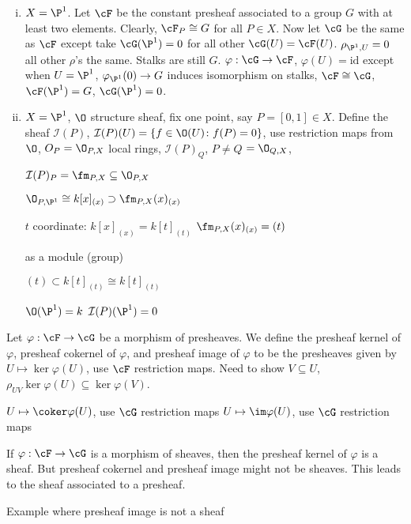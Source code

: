 \begin{enumerate}[(i)]
\item $X= \P^1$. Let $\cF$ be the constant presheaf associated to a group $G$ with at least two elements. Clearly, $\cF_P \cong G$ for all $P \in X$. Now let $\cG$ be the same as $\cF$ except take $\cG(\P^1)=0$ for all other $\cG(U)= \cF(U)$. $\rho_{\P^1,U}= 0$ all other $\rho$'s the same. Stalks are still $G$. $\varphi: \cG \to \cF$, $\varphi(U)= \text{id}$ except when $U= \P^1$, $\varphi_{\P^1}(0) \to G$  induces isomorphism on stalks, $\cF \cong \cG$, $\cF(\P^1)= G$, $\cG(\P^1)= 0$.

\item $X= \P^1$, $\O$ structure sheaf, fix one point, say $P= [0,1] \in X$. Define the sheaf $\mathcal{I}(P)$, $\mathcal{I}(P)(U)= \{ f \in \O(U) \colon f(P)=0 \}$, use restriction maps from $\O$, $O_P= \O_{P,X}$ local rings, $\mathcal{I}(P)_Q$, $P \neq Q$ $=\O_{Q,X}$,

$\mathcal{I}(P)_P= \fm_{P,X} \subseteq \O_{P,X}$

$\O_{P,\P^1} \cong k[x]_{(x)} \supset \fm_{P,X}(x)_{(x)}$

$t$ coordinate: $k[x]_{(x)}= k[t]_{(t)}$
$\fm_{P,X}(x)_{(x)}= (t)$ 

as a module (group)

$(t) \subset k[t]_{(t)} \cong k[t]_{(t)}$

$\O(\P^1)= k$
$\mathcal{I}(P)(\P^1)= 0$
\end{enumerate}



\begin{dfn}
Let $\varphi: \cF \to \cG$ be a morphism of presheaves. We define the presheaf kernel of $\varphi$,  presheaf cokernel of $\varphi$, and presheaf image of $\varphi$ to be the presheaves given by $U \mapsto \ker \varphi(U)$, use $\cF$ restriction maps. Need to show $V \subseteq U$, $\rho_{UV} \ker \varphi(U) \subseteq \ker \varphi(V)$.

$U \mapsto \coker \varphi(U)$, use $\cG$ restriction maps
$U \mapsto \im \varphi(U)$, use $\cG$ restriction maps
\end{dfn}


If $\varphi: \cF \to \cG$ is a morphism of sheaves, then the presheaf kernel of $\varphi$ is a sheaf. But presheaf cokernel and presheaf image might not be sheaves. This leads to the sheaf associated to a presheaf. 




Example where presheaf image is not a sheaf

